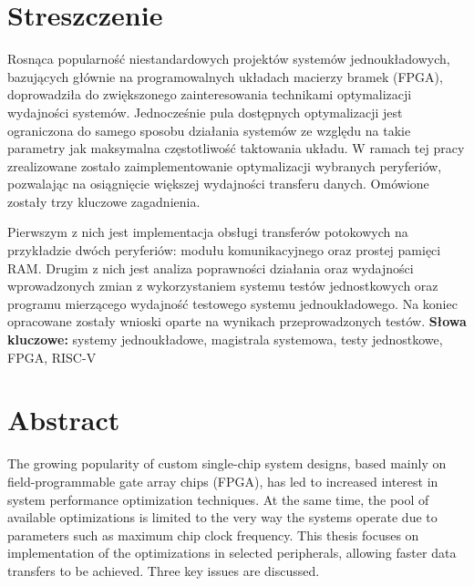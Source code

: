 \documentclass[a4paper,12pt,twoside]{article}
\author{Kołucki Rafał}
\begin{document}
\pagestyle{fancy}
\fancyhead{} %
\fancyfoot{} %

\maketitle

\newpage
\newpage

\section*{Streszczenie}
Rosnąca popularność niestandardowych projektów systemów jednoukładowych, bazujących głównie na programowalnych układach macierzy bramek (FPGA), doprowadziła do zwiększonego zainteresowania technikami optymalizacji wydajności systemów. Jednocześnie pula dostępnych optymalizacji jest ograniczona do samego sposobu działania systemów ze względu na takie parametry jak maksymalna częstotliwość taktowania układu. W ramach tej pracy zrealizowane zostało zaimplementowanie optymalizacji wybranych peryferiów, pozwalając na osiągnięcie większej wydajności transferu danych. Omówione zostały trzy kluczowe zagadnienia.

Pierwszym z nich jest implementacja obsługi transferów potokowych na przykładzie dwóch peryferiów: modułu komunikacyjnego oraz prostej pamięci RAM. Drugim z nich jest analiza poprawności działania oraz wydajności wprowadzonych zmian z wykorzystaniem systemu testów jednostkowych oraz programu mierzącego wydajność testowego systemu jednoukładowego. Na koniec opracowane zostały wnioski oparte na wynikach przeprowadzonych testów.
\newline\newline\newline
\textbf{Słowa kluczowe:} systemy jednoukładowe, magistrala systemowa, testy jednostkowe, FPGA, RISC-V
\newpage

\section*{Abstract}
The growing popularity of custom single-chip system designs, based mainly on field-programmable gate array chips (FPGA), has led to increased interest in system performance optimization techniques. At the same time, the pool of available optimizations is limited to the very way the systems operate due to parameters such as maximum chip clock frequency. This thesis focuses on implementation of the optimizations in selected peripherals, allowing faster data transfers to be achieved. Three key issues are discussed.
\end{document}
